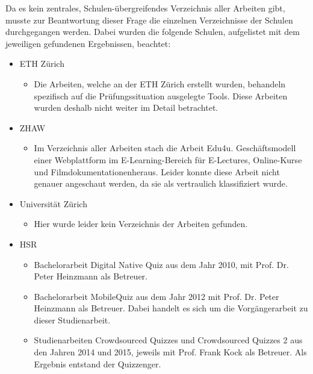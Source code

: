 Da es kein zentrales, Schulen-übergreifendes Verzeichnis aller Arbeiten gibt, musste zur Beantwortung dieser Frage die einzelnen Verzeichnisse der Schulen durchgegangen werden. Dabei wurden die folgende Schulen, aufgelistet mit dem jeweiligen gefundenen Ergebnissen, beachtet:
\begin{itemize}
	\item ETH Zürich
	\begin{itemize}
		\item Die Arbeiten, welche an der ETH Zürich erstellt wurden, behandeln spezifisch auf die Prüfungssituation ausgelegte Tools. Diese Arbeiten wurden deshalb nicht weiter im Detail betrachtet. \cite{zeller_automated_2014} \cite{antonucci_autoteach_2014} \cite{heinrich_design_2008} \cite{nanzer_einsatz_2005}
	\end{itemize}
	\item ZHAW
	\begin{itemize}
		\item Im Verzeichnis aller Arbeiten stach die Arbeit \glqq Edu4u. Geschäftsmodell einer Webplattform im E-Learning-Bereich für E-Lectures, Online-Kurse und Filmdokumentationen\grqq heraus. Leider konnte diese Arbeit nicht genauer angeschaut werden, da sie als vertraulich klassifiziert wurde. \cite{_bachelorarbeiten-2013-zhaw-sml.pdf_}
	\end{itemize}
	\item Universität Zürich
	\begin{itemize}
		\item Hier wurde leider kein Verzeichnis der Arbeiten gefunden.
	\end{itemize}
	\item HSR
	\begin{itemize}
		\item Bachelorarbeit \glqq Digital Native Quiz\grqq \cite{grob_digital_2010} aus dem Jahr 2010, mit Prof. Dr. Peter Heinzmann als Betreuer.
		\item Bachelorarbeit \glqq MobileQuiz\grqq \cite{khalid_bachelorarbeit_mobile_quiz_juni_2012.pdf_2012} aus dem Jahr 2012 mit Prof. Dr. Peter Heinzmann als Betreuer. Dabei handelt es sich um die Vorgängerarbeit zu dieser Studienarbeit.
		\item Studienarbeiten \glqq Crowdsourced Quizzes\grqq \cite{_technischer_bericht-quizzenger_crowdsourced_quizzes.pdf_} und \glqq Crowdsourced Quizzes 2\grqq \cite{_technischer_bericht-quizzenger-2.pdf_} aus den Jahren 2014 und 2015, jeweils mit Prof. Frank Kock als Betreuer. Als Ergebnis entstand der Quizzenger.
	\end{itemize}
\end{itemize}

